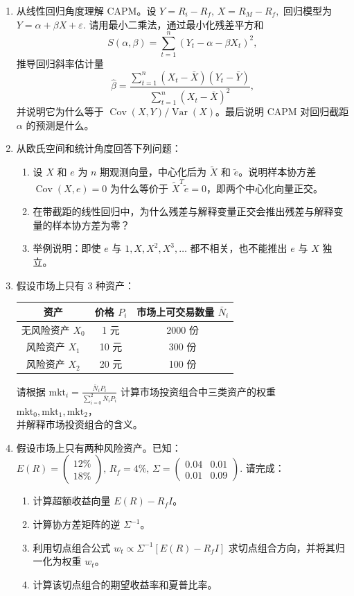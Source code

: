 \documentclass{article}
\begin{document}
\begin{enumerate}[label=\textbf{\arabic*.}]
\item 从线性回归角度理解 CAPM。设
\(
Y=R_i-R_f,\, X=R_M-R_f,
\)
回归模型为
\(
Y=\alpha+\beta X+\varepsilon.
\)
请用最小二乘法，通过最小化残差平方和
\[
S(\alpha,\beta)=\sum_{t=1}^n (Y_t-\alpha-\beta X_t)^2,
\]
推导回归斜率估计量
\[
\hat\beta=\frac{\sum_{t=1}^n (X_t-\bar X)(Y_t-\bar Y)}{\sum_{t=1}^n (X_t-\bar X)^2},
\]
并说明它为什么等于 \(\operatorname{Cov}(X,Y)/\operatorname{Var}(X)\)。最后说明 CAPM 对回归截距 \(\alpha\) 的预测是什么。

\newpage

\item 从欧氏空间和统计角度回答下列问题：
\begin{enumerate}[label=(\alph*)]
\item 设 \(X\) 和 \(e\) 为 \(n\) 期观测向量，中心化后为 \(\tilde X\) 和 \(\tilde e\)。说明样本协方差 \(\operatorname{Cov}(X,e)=0\) 为什么等价于 \(\tilde X^T\tilde e=0\)，即两个中心化向量正交。
\item 在带截距的线性回归中，为什么残差与解释变量正交会推出残差与解释变量的样本协方差为零？
\item 举例说明：即使 \(e\) 与 \(1,X,X^2,X^3,\ldots\) 都不相关，也不能推出 \(e\) 与 \(X\) 独立。
\end{enumerate}

\item 假设市场上只有 3 种资产：
\begin{center}
\begin{tabular}{c|cc}
资产 & 价格 \(P_i\) & 市场上可交易数量 \(\bar N_i\) \\
\hline
无风险资产 \(X_0\) & 1 元 & 2000 份 \\
风险资产 \(X_1\) & 10 元 & 300 份 \\
风险资产 \(X_2\) & 20 元 & 100 份 \\
\end{tabular}
\end{center}
请根据
\(\displaystyle 
\text{mkt}_i=\frac{\bar N_i P_i}{\sum_{i=0}^{2}\bar N_i P_i}
\) 
计算市场投资组合中三类资产的权重 \(\text{mkt}_0,\text{mkt}_1,\text{mkt}_2\)，\\ 
并解释市场投资组合的含义。

\item 假设市场上只有两种风险资产。已知：
\(\displaystyle 
E(R)=\begin{pmatrix}12\%\\18\%\end{pmatrix},\, 
R_f=4\%,\, 
\Sigma=\begin{pmatrix}0.04&0.01\\0.01&0.09\end{pmatrix}.
\) 
请完成：
\begin{enumerate}[label=(\alph*)]
\item 计算超额收益向量 \(E(R)-R_f I\)。
\item 计算协方差矩阵的逆 \(\Sigma^{-1}\)。
\item 利用切点组合公式
\( 
w_t\propto \Sigma^{-1}[E(R)-R_f I]
\) 
求切点组合方向，并将其归一化为权重 \(w_t\)。
\item 计算该切点组合的期望收益率和夏普比率。
\end{enumerate}


\end{enumerate}
\end{document}
